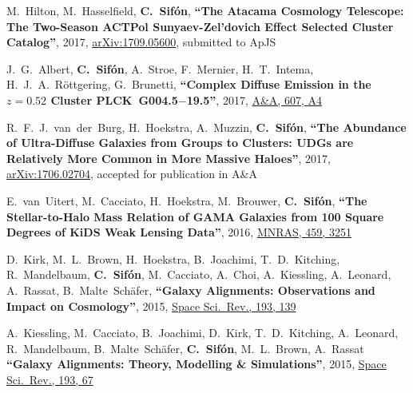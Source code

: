 \documentclass{article}
\def\myself{\textbf{\color{red} C.~Sif\'on}}
\def\aap{A\&A}
\def\apjs{ApJS}
\def\mnras{MNRAS}
\def\ssr{Space Sci.\ Rev.}
\newcommand{\accepted}[1]{accepted for publication in #1}
\newcommand{\submitted}[1]{submitted to #1}
\newcommand{\paper}[1]{\textbf{``#1''}}
\begin{document}
\vspace{-0.5cm}
\begin{etaremune}

\item
M.~Hilton, M.~Hasselfield, \myself, 
\paper{The Atacama Cosmology Telescope: The Two-Season ACTPol Sunyaev-Zel'dovich 
Effect Selected Cluster Catalog},
2017, \href{http://adsabs.harvard.edu/abs/2017arXiv170905600H}{arXiv:1709.05600},
\submitted{\apjs}

\item
J.~G.~Albert, \myself, A.~Stroe, F.~Mernier, H.~T.~Intema, H.~J.~A.~R\"ottgering, 
G.~Brunetti,
\paper{Complex Diffuse Emission in the $z=0.52$ Cluster PLCK~G004.5$-$19.5},
2017, \href{https://www.aanda.org/articles/aa/full_html/2017/11/aa30496-17/aa30496-17.html}{\aap, 607, A4}


\item
R.~F.~J.~van~der~Burg, H.~Hoekstra, A.~Muzzin, \myself, 
\paper{The Abundance of Ultra-Diffuse Galaxies from Groups to Clusters: UDGs 
are Relatively More Common in More Massive Haloes},
2017, \href{http://adsabs.harvard.edu/abs/2017arXiv170602704V}{arXiv:1706.02704},
\accepted{\aap}

\item
E.~van~Uitert, M.~Cacciato, H.~Hoekstra, M.~Brouwer, \myself, 
\paper{The Stellar-to-Halo Mass Relation of GAMA Galaxies from 100 Square Degrees of KiDS Weak Lensing Data},
2016, \href{http://adsabs.harvard.edu/abs/2016MNRAS.459.3251V}{\mnras, 459, 3251}

\item
D.~Kirk, M.~L.~Brown, H.~Hoekstra, B.~Joachimi, T.~D.~Kitching, R.~Mandelbaum, \myself, 
M.~Cacciato, A.~Choi, A.~Kiessling, A.~Leonard, A.~Rassat, B.~Malte~Sch\"afer,
\paper{Galaxy Alignments: Observations and Impact on Cosmology},
2015, \href{http://adsabs.harvard.edu/doi/10.1007/s11214-015-0213-4}{\ssr, 193, 139}

\item
A.~Kiessling, M.~Cacciato, B.~Joachimi, D.~Kirk, T.~D.~Kitching, A.~Leonard, R.~Mandelbaum, 
B.~Malte~Sch\"afer, \myself, M.~L.~Brown, A.~Rassat
\paper{Galaxy Alignments: Theory, Modelling \& Simulations},
2015, \href{http://adsabs.harvard.edu/doi/10.1007/s11214-015-0203-6}{\ssr, 193, 67}


\end{etaremune}
\end{document}
